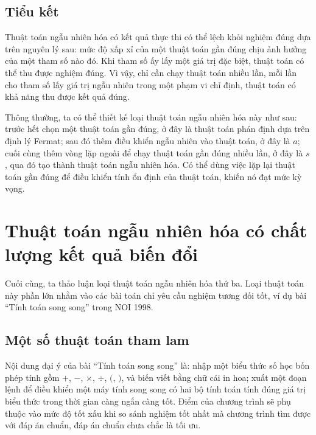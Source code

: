 \documentclass[11pt]{article}
\begin{document}
\subsection{Tiểu kết}

Thuật toán ngẫu nhiên hóa có kết quả thực thi có thể lệch khỏi nghiệm đúng
dựa trên nguyên lý sau: mức độ xấp xỉ của một thuật toán gần đúng chịu ảnh
hưởng của một tham số nào đó. Khi tham số ấy lấy một giá trị đặc biệt, thuật
toán có thể thu được nghiệm đúng. Vì vậy, chỉ cần chạy thuật toán nhiều lần,
mỗi lần cho tham số lấy giá trị ngẫu nhiên trong một phạm vi chỉ định, thuật
toán có khả năng thu được kết quả đúng.

Thông thường, ta có thể thiết kế loại thuật toán ngẫu nhiên hóa này như sau:
trước hết chọn một thuật toán gần đúng, ở đây là thuật toán phán định dựa trên
định lý Fermat; sau đó thêm điều khiển ngẫu nhiên vào thuật toán, ở đây là
\(a\); cuối cùng thêm vòng lặp ngoài để chạy thuật toán gần đúng nhiều lần,
ở đây là \(s\), qua đó tạo thành thuật toán ngẫu nhiên hóa. Có thể dùng việc
lặp lại thuật toán gần đúng để điều khiển tính ổn định của thuật toán, khiến
nó đạt mức kỳ vọng.

\section{Thuật toán ngẫu nhiên hóa có chất lượng kết quả biến đổi}

Cuối cùng, ta thảo luận loại thuật toán ngẫu nhiên hóa thứ ba. Loại thuật
toán này phần lớn nhằm vào các bài toán chỉ yêu cầu nghiệm tương đối tốt, ví
dụ bài ``Tính toán song song'' trong NOI 1998.

\subsection{Một số thuật toán tham lam}

Nội dung đại ý của bài ``Tính toán song song'' là: nhập một biểu thức số học
bốn phép tính gồm \(+\), \(-\), \(\times\), \(\div\), \((\), \()\), và biến
viết bằng chữ cái in hoa; xuất một đoạn lệnh để điều khiển một máy tính song
song có hai bộ tính toán tính đúng giá trị biểu thức trong thời gian càng ngắn
càng tốt. Điểm của chương trình sẽ phụ thuộc vào mức độ tốt xấu khi so sánh
nghiệm tốt nhất mà chương trình tìm được với đáp án chuẩn, đáp án chuẩn chưa
chắc là tối ưu.
\end{document}
